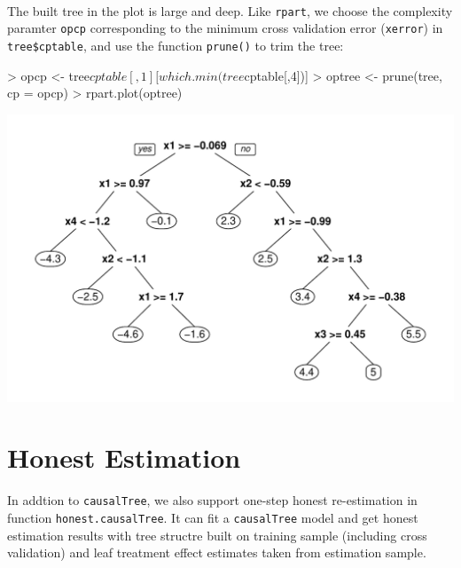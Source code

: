 \documentclass[11pt]{article}
\renewenvironment{Schunk}{\vspace{\topsep}}{\vspace{\topsep}}
\begin{document}
\\
The built tree in the plot is large and deep. Like \texttt{rpart}, we choose the complexity paramter \texttt{opcp} corresponding to the minimum cross validation error (\texttt{xerror}) in \texttt{tree\$cptable}, and use the function \texttt{prune()} to trim the tree:
\begin{Schunk}
\begin{Sinput}
> opcp <- tree$cptable[, 1][which.min(tree$cptable[,4])]
> optree <- prune(tree, cp = opcp)
> rpart.plot(optree)
\end{Sinput}
\end{Schunk}
\includegraphics{briefintro-prune}
\section{Honest Estimation}
In addtion to \texttt{causalTree}, we also support one-step honest re-estimation in function \texttt{honest.causalTree}. It can fit a \texttt{causalTree} model and get honest estimation results with tree structre built on training sample (including cross validation) and leaf treatment effect estimates taken from estimation sample.
\end{document}
